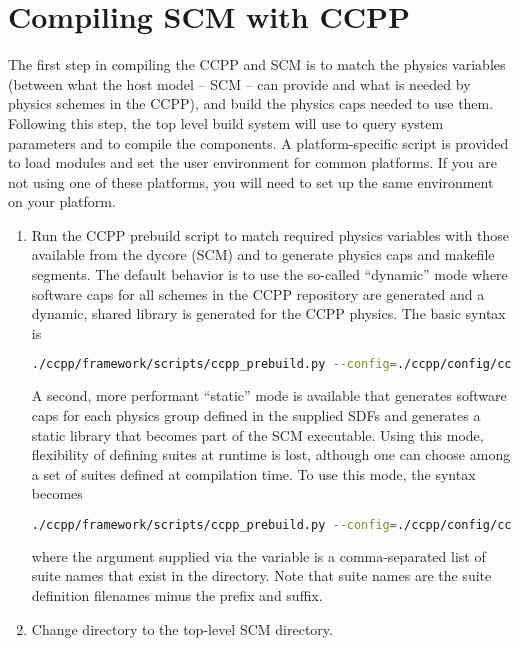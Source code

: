 \section{Compiling SCM with CCPP}
\label{section: compiling}
The first step in compiling the CCPP and SCM is to match the physics variables (between what the host model -- SCM -- can provide and what is needed by physics schemes in the CCPP), and build the physics caps needed to use them.  Following this step, the top level build system will use  to query system parameters and  to compile the components.  A platform-specific script is provided to load modules and set the user environment for common platforms.  If you are not using one of these platforms, you will need to set up the same environment on your platform.
\begin{enumerate}
    \item Run the CCPP prebuild script to match required physics variables with those available from the dycore (SCM) and to generate physics caps and makefile segments. The default behavior is to use the so-called ``dynamic'' mode where software caps for all schemes in the CCPP repository are generated and a dynamic, shared library is generated for the CCPP physics. The basic syntax is
\begin{lstlisting}[language=bash]
./ccpp/framework/scripts/ccpp_prebuild.py --config=./ccpp/config/ccpp_prebuild_config.py [--debug]
\end{lstlisting}
A second, more performant ``static'' mode is available that generates software caps for each physics group defined in the supplied SDFs and generates a static library that becomes part of the SCM executable. Using this mode, flexibility of defining suites at runtime is lost, although one can choose among a set of suites defined at compilation time. To use this mode, the syntax becomes
\begin{lstlisting}[language=bash]
./ccpp/framework/scripts/ccpp_prebuild.py --config=./ccpp/config/ccpp_prebuild_config.py --static --suites=SCM_GFS_v15,SCM_GFS_v15plus,SCM_GSD_v0[...] [--debug]
\end{lstlisting}
where the argument supplied via the  variable is a comma-separated list of suite names that exist in the  directory. Note that suite names are the suite definition filenames minus the  prefix and  suffix.
    \item Change directory to the top-level SCM directory.
\begin{lstlisting}[language=bash]

\end{lstlisting}
\end{enumerate}
